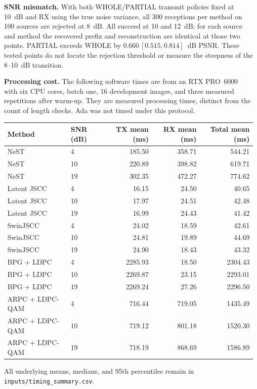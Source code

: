 \documentclass[11pt,letterpaper]{article}
\begin{document}
\textbf{SNR mismatch.} With both WHOLE/PARTIAL transmit policies fixed at 10~dB and RX using the true noise variance, all 300 receptions per method on 100 sources are rejected at 8~dB. All succeed at 10 and 12~dB; for each source and method the recovered prefix and reconstruction are identical at those two points. PARTIAL exceeds WHOLE by $0.660\,[0.515,0.814]$~dB PSNR. These tested points do not locate the rejection threshold or measure the steepness of the 8--10~dB transition.

\textbf{Processing cost.} The following software times are from an RTX PRO~6000 with six CPU cores, batch one, 16 development images, and three measured repetitions after warm-up. They are measured processing times, distinct from the count of length checks. Ada was not timed under this protocol.
\begin{center}\small\begin{tabular}{llrrr}\toprule
Method & SNR (dB) & TX mean (ms) & RX mean (ms) & Total mean (ms)\\\midrule

NeST & 4 & 185.50 & 358.71 & 544.21\\
NeST & 10 & 220.89 & 398.82 & 619.71\\
NeST & 19 & 302.35 & 472.27 & 774.62\\
Latent JSCC & 4 & 16.15 & 24.50 & 40.65\\
Latent JSCC & 10 & 17.97 & 24.51 & 42.48\\
Latent JSCC & 19 & 16.99 & 24.43 & 41.42\\
SwinJSCC & 4 & 24.02 & 18.59 & 42.61\\
SwinJSCC & 10 & 24.81 & 19.89 & 44.69\\
SwinJSCC & 19 & 24.90 & 18.43 & 43.32\\
BPG + LDPC & 4 & 2285.93 & 18.50 & 2304.43\\
BPG + LDPC & 10 & 2269.87 & 23.15 & 2293.01\\
BPG + LDPC & 19 & 2269.24 & 27.26 & 2296.50\\
ARPC + LDPC-QAM & 4 & 716.44 & 719.05 & 1435.49\\
ARPC + LDPC-QAM & 10 & 719.12 & 801.18 & 1520.30\\
ARPC + LDPC-QAM & 19 & 718.19 & 868.69 & 1586.89\\
\bottomrule\end{tabular}\end{center}
All underlying means, medians, and 95th percentiles remain in \texttt{inputs/timing\_summary.csv}.
\end{document}
